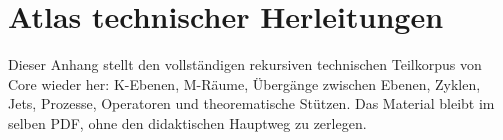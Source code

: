 \section{Atlas technischer Herleitungen}
\label{sec:oc-core-1-3-technical-derivation-atlas}

Dieser Anhang stellt den vollständigen rekursiven technischen Teilkorpus von
Core wieder her: K-Ebenen, M-Räume, Übergänge zwischen Ebenen, Zyklen, Jets,
Prozesse, Operatoren und theorematische Stützen. Das Material bleibt im selben
PDF, ohne den didaktischen Hauptweg zu zerlegen.

\begingroup
\let\ocappendixsection\section
\let\ocappendixsubsection\subsection
\let\ocappendixsubsubsection\subsubsection
\renewcommand{\section}{\ocappendixsubsection}
\renewcommand{\subsection}{\ocappendixsubsubsection}

\endgroup

